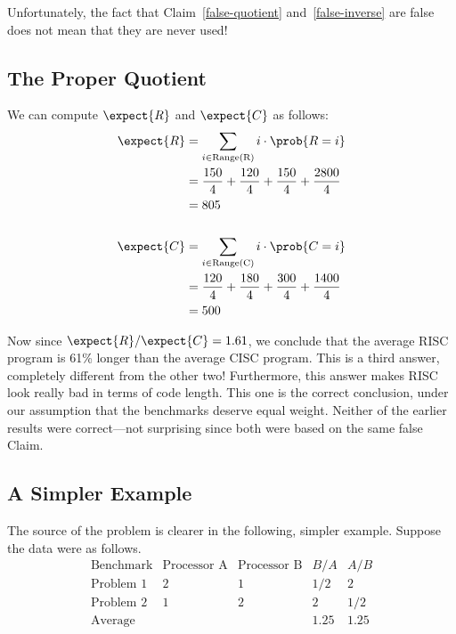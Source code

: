 Unfortunately, the fact that Claim~\ref{false-quotient}
and~\ref{false-inverse} are false does not mean that they are never used!

\subsection{The Proper Quotient}

We can compute $\expect{R}$ and $\expect{C}$ as follows:
\begin{align*}
\expect{R}  
    & = \sum_{i \in \text{Range(R)}} i \cdot \prob{R = i} \\
    & = \frac{150}{4}+\frac{120}{4}+\frac{150}{4}+\frac{2800}{4} \\
    & = 805 \\
\\
\expect{C}
    & = \sum_{i \in \text{Range(C)}} i \cdot \prob{C = i} \\
    & = \frac{120}{4}+\frac{180}{4}+\frac{300}{4}+\frac{1400}{4} \\
    & = 500
\end{align*}

Now since $\expect{R}/\expect{C} = 1.61$, we conclude that the average
RISC program is 61\% longer than the average CISC program.  This is a
third answer, completely different from the other two!  Furthermore, this
answer makes RISC look really bad in terms of code length.  This one is
the correct conclusion, under our assumption that the benchmarks deserve
equal weight.  Neither of the earlier results were correct---not
surprising since both were based on the same false Claim.

\subsection{A Simpler Example}

The source of the problem is clearer in the following, simpler example.
Suppose the data were as follows.
\[
\begin{array}{lcccc}
\text{Benchmark}        & \text{Processor A}    & \text{Processor B}
                        & B / A                 & A / B  \\
\hline
\text{Problem 1}        & 2                     & 1
                        & 1/2                   & 2 \\
\text{Problem 2}        & 1                     & 2
                        & 2                     & 1/2 \\
\hline
\text{Average}          &                       &
                        & 1.25                  & 1.25
\end{array}
\]

